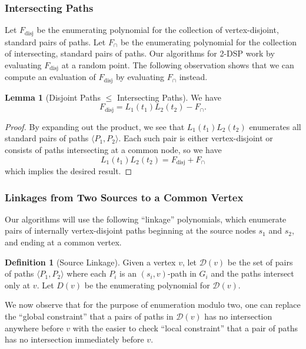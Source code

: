 \documentclass[11pt]{article}
\DeclareMathOperator{\disj}{disj}
\newcommand{\ca}{\mathcal}
\theoremstyle{definition}
\newtheorem{lemma}[theorem]{Lemma}
\newtheorem{definition}[theorem]{Definition}
\begin{document}
\subsubsection*{Intersecting Paths}

\noindent Let $F_{\disj}$ be the enumerating polynomial for the collection of vertex-disjoint, standard pairs of paths.
Let $F_\cap$ be the enumerating polynomial for the collection of intersecting, standard pairs of paths.
Our algorithms for \textsf{2-DSP} work by evaluating $F_{\disj}$ at a random point.
The following observation shows that we can compute an evaluation of $F_{\disj}$ by evaluating $F_\cap$ instead.

\begin{lemma}[Disjoint Paths $\le$ Intersecting Paths]
    \label{disj-to-intersect}
    We have
    \[F_{\disj} = L_1(t_1)L_2(t_2) - F_{\cap}.\]
\end{lemma}
\begin{proof}
            By expanding out the product, we see that $L_1(t_1)L_2(t_2)$ enumerates all standard pairs of paths $\langle P_1,P_2\rangle$.
            Each such pair is either vertex-disjoint or consists of paths intersecting at a common node, so we have 
            \[L_1(t_1)L_2(t_2) = F_{\disj} + F_{\cap}\]
            which implies the desired result.
\end{proof}

\subsubsection*{Linkages from Two Sources to a Common Vertex}

Our algorithms will use the following ``linkage'' polynomials, which enumerate pairs of internally vertex-disjoint paths beginning at the source nodes $s_1$ and $s_2$, and ending at a common vertex.

\begin{definition}[Source Linkage]
\label{def:disjoint-v}
Given a vertex $v$, let $\ca{D}(v)$ be the set of pairs of paths $\langle P_1,P_2\rangle$ where each $P_i$ is an $(s_i,v)$-path in $G_i$ and the paths intersect only at $v$.
Let $D(v)$ be the enumerating polynomial for $\ca{D}(v)$.
\end{definition}

We now observe that for the purpose of enumeration modulo two, one can replace the ``global constraint'' that a pairs of paths in $\ca{D}(v)$ has no intersection anywhere before $v$ with the easier to check ``local constraint'' that a pair of paths has no intersection immediately before $v$.
\end{document}
